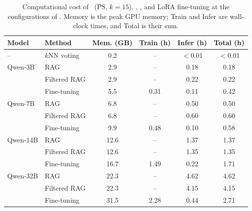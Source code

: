 \begin{table}[t]
  \centering
  \caption{Computational cost of \knn\ (PS, $k{=}15$), \rag, \frag, and LoRA fine-tuning at the configurations of . Memory is the peak GPU memory; Train and Infer are wall-clock times, and Total is their sum.}
  \label{tab:method-cost}
  \footnotesize
  \setlength{\tabcolsep}{3.5pt}
  \begin{tabular}{llcccc}
    \toprule
    Model & Method & Mem. (GB) & Train (h) & Infer (h) & Total (h) \\
    \midrule
    -- & $k$NN voting & 0.2 & -- & $<$0.01 & $<$0.01 \\
    \addlinespace[2pt]
    Qwen-3B & RAG & 2.9 & -- & 0.18 & 0.18 \\
     & Filtered RAG & 2.9 & -- & 0.22 & 0.22 \\
     & Fine-tuning & 5.5 & 0.31 & 0.11 & 0.42 \\
    \addlinespace[2pt]
    Qwen-7B & RAG & 6.8 & -- & 0.50 & 0.50 \\
     & Filtered RAG & 6.8 & -- & 0.60 & 0.60 \\
     & Fine-tuning & 9.9 & 0.48 & 0.10 & 0.58 \\
    \addlinespace[2pt]
    Qwen-14B & RAG & 12.6 & -- & 1.37 & 1.37 \\
     & Filtered RAG & 12.6 & -- & 1.35 & 1.35 \\
     & Fine-tuning & 16.7 & 1.49 & 0.22 & 1.71 \\
    \addlinespace[2pt]
    Qwen-32B & RAG & 22.3 & -- & 4.62 & 4.62 \\
     & Filtered RAG & 22.3 & -- & 4.15 & 4.15 \\
     & Fine-tuning & 31.5 & 2.28 & 0.44 & 2.71 \\
    \bottomrule
  \end{tabular}
\end{table}
